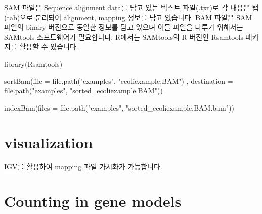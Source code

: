 \documentclass[
]{book}
\newenvironment{Shaded}{\begin{snugshade}}{\end{snugshade}}
\newcommand{\AttributeTok}[1]{\textcolor[rgb]{0.77,0.63,0.00}{#1}}
\newcommand{\FunctionTok}[1]{\textcolor[rgb]{0.00,0.00,0.00}{#1}}
\newcommand{\NormalTok}[1]{#1}
\newcommand{\StringTok}[1]{\textcolor[rgb]{0.31,0.60,0.02}{#1}}
\begin{document}
SAM 파일은 Sequence alignment data를 담고 있는 텍스트 파일(.txt)로 각 내용은 탭(tab)으로 분리되어 alignment, mapping 정보를 담고 있습니다. BAM 파일은 SAM 파일의 binary 버전으로 동일한 정보를 담고 있으며 이들 파일을 다루기 위해서는 SAMtools 소프트웨어가 필요합니다. R에서는 SAMtools의 R 버전인 Rsamtools 패키지를 활용할 수 있습니다.

\begin{Shaded}
\begin{Highlighting}[]
\FunctionTok{library}\NormalTok{(Rsamtools)}

\FunctionTok{sortBam}\NormalTok{(}\AttributeTok{file =} \FunctionTok{file.path}\NormalTok{(}\StringTok{"examples"}\NormalTok{, }\StringTok{"ecoliexample.BAM"}\NormalTok{)}
\NormalTok{        , }\AttributeTok{destination =} \FunctionTok{file.path}\NormalTok{(}\StringTok{"examples"}\NormalTok{, }\StringTok{"sorted\_ecoliexample.BAM"}\NormalTok{))}

\FunctionTok{indexBam}\NormalTok{(}\AttributeTok{files =} \FunctionTok{file.path}\NormalTok{(}\StringTok{"examples"}\NormalTok{, }\StringTok{"sorted\_ecoliexample.BAM.bam"}\NormalTok{))}
\end{Highlighting}
\end{Shaded}

\hypertarget{visualization-1}{%
\section{visualization}\label{visualization-1}}

\href{https://software.broadinstitute.org/software/igv/}{IGV}를 활용하여 mapping 파일 가시화가 가능합니다.

\hypertarget{counting-in-gene-models}{%
\section{Counting in gene models}\label{counting-in-gene-models}}
\end{document}
